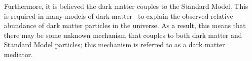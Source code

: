 %

Furthermore, it is believed the dark matter couples to the Standard Model.
This is required in many models of dark matter~\cite{theo-bsm_dm_feng} to explain the
observed relative abundance of dark matter particles in the universe.
As a result, this means that there may be some unknown mechanism that couples to both dark matter and
Standard Model particles; this mechanism is referred to as a dark matter mediator.

